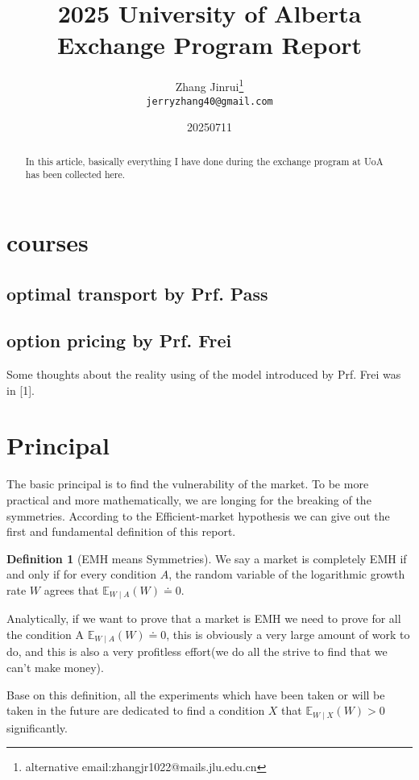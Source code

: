 \documentclass{article}
\title{2025 University of Alberta Exchange Program Report}
\author{Zhang Jinrui\thanks{alternative email:zhangjr1022@mails.jlu.edu.cn} \\ \texttt{jerryzhang40@gmail.com}}
\date{20250711}  %
\theoremstyle{definition} %
\newtheorem{definition}{Definition}[section]
\begin{document}
\maketitle

\begin{abstract}
    In this article, basically everything I have done during
    the exchange program at UoA has been collected
    here.
\end{abstract}

\section{courses}
\subsection{optimal transport by Prf. Pass}
\subsection{option pricing by Prf. Frei}
Some thoughts about the reality using of the
model introduced by Prf. Frei was in [1].

\section{Principal}
The basic principal is to find the vulnerability
of the market. To be more practical and more
mathematically, we are longing for the breaking
of the symmetries. According to the
Efficient-market hypothesis\cite[Hypothesis]{EMH}
we can give out the first and fundamental
definition of this report.

\begin{definition}[EMH means Symmetries]
    \label{def:mydefinition}
    We say a market is completely EMH if and
    only if for every condition $A$, the random
    variable of the logarithmic growth rate $W$
    agrees that $\mathbb{E}_{W\mid A}(W)\doteq 0$.
\end{definition}

Analytically, if we want to prove that a market is
EMH we need to prove for all the condition A
$\mathbb{E}_{W\mid A}(W)\doteq 0$, this is
obviously a very large amount of work to do, and
this is also a very profitless effort(we do all
the strive to find that we can't make money).

Base on this definition, all the experiments which
have been taken or will be taken in the future
are dedicated to find a condition $X$ that
$\mathbb{E}_{W\mid X}(W)>0$ significantly.
\end{document}
